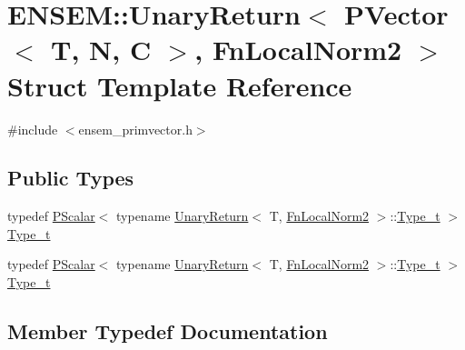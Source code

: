 \hypertarget{structENSEM_1_1UnaryReturn_3_01PVector_3_01T_00_01N_00_01C_01_4_00_01FnLocalNorm2_01_4}{}\section{E\+N\+S\+EM\+:\+:Unary\+Return$<$ P\+Vector$<$ T, N, C $>$, Fn\+Local\+Norm2 $>$ Struct Template Reference}
\label{structENSEM_1_1UnaryReturn_3_01PVector_3_01T_00_01N_00_01C_01_4_00_01FnLocalNorm2_01_4}


{\ttfamily \#include $<$ensem\+\_\+primvector.\+h$>$}

\subsection*{Public Types}
\begin{DoxyCompactItemize}
\item 
typedef \mbox{\hyperlink{classENSEM_1_1PScalar}{P\+Scalar}}$<$ typename \mbox{\hyperlink{structENSEM_1_1UnaryReturn}{Unary\+Return}}$<$ T, \mbox{\hyperlink{structENSEM_1_1FnLocalNorm2}{Fn\+Local\+Norm2}} $>$\+::\mbox{\hyperlink{structENSEM_1_1UnaryReturn_3_01PVector_3_01T_00_01N_00_01C_01_4_00_01FnLocalNorm2_01_4_a80720f6a92790f2897bfe4bc434f64d8}{Type\+\_\+t}} $>$ \mbox{\hyperlink{structENSEM_1_1UnaryReturn_3_01PVector_3_01T_00_01N_00_01C_01_4_00_01FnLocalNorm2_01_4_a80720f6a92790f2897bfe4bc434f64d8}{Type\+\_\+t}}
\item 
typedef \mbox{\hyperlink{classENSEM_1_1PScalar}{P\+Scalar}}$<$ typename \mbox{\hyperlink{structENSEM_1_1UnaryReturn}{Unary\+Return}}$<$ T, \mbox{\hyperlink{structENSEM_1_1FnLocalNorm2}{Fn\+Local\+Norm2}} $>$\+::\mbox{\hyperlink{structENSEM_1_1UnaryReturn_3_01PVector_3_01T_00_01N_00_01C_01_4_00_01FnLocalNorm2_01_4_a80720f6a92790f2897bfe4bc434f64d8}{Type\+\_\+t}} $>$ \mbox{\hyperlink{structENSEM_1_1UnaryReturn_3_01PVector_3_01T_00_01N_00_01C_01_4_00_01FnLocalNorm2_01_4_a80720f6a92790f2897bfe4bc434f64d8}{Type\+\_\+t}}
\end{DoxyCompactItemize}


\subsection{Member Typedef Documentation}
\mbox{\label{structENSEM_1_1UnaryReturn_3_01PVector_3_01T_00_01N_00_01C_01_4_00_01FnLocalNorm2_01_4_a80720f6a92790f2897bfe4bc434f64d8}} 
